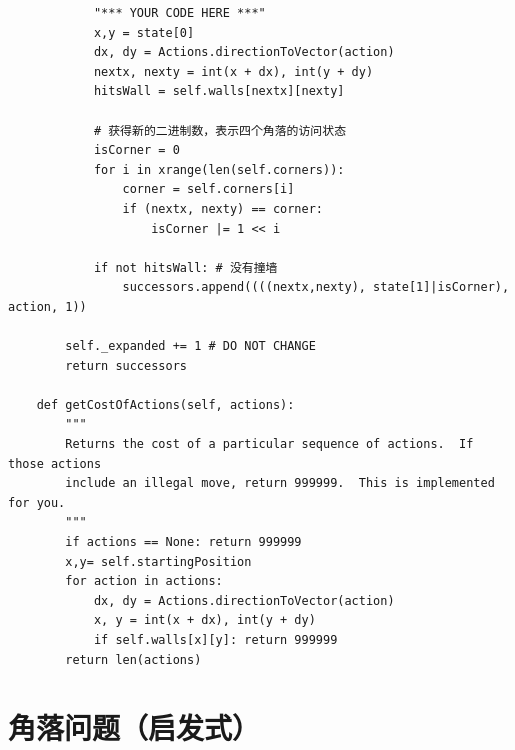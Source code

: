 \documentclass[forprint]{WHUBachelor}
\begin{document}
\begin{verbatim}
            "*** YOUR CODE HERE ***"
            x,y = state[0]
            dx, dy = Actions.directionToVector(action)
            nextx, nexty = int(x + dx), int(y + dy)
            hitsWall = self.walls[nextx][nexty]

            # 获得新的二进制数，表示四个角落的访问状态
            isCorner = 0
            for i in xrange(len(self.corners)):
                corner = self.corners[i]
                if (nextx, nexty) == corner:
                    isCorner |= 1 << i

            if not hitsWall: # 没有撞墙
                successors.append((((nextx,nexty), state[1]|isCorner), action, 1))

        self._expanded += 1 # DO NOT CHANGE
        return successors

    def getCostOfActions(self, actions):
        """
        Returns the cost of a particular sequence of actions.  If those actions
        include an illegal move, return 999999.  This is implemented for you.
        """
        if actions == None: return 999999
        x,y= self.startingPosition
        for action in actions:
            dx, dy = Actions.directionToVector(action)
            x, y = int(x + dx), int(y + dy)
            if self.walls[x][y]: return 999999
        return len(actions)

\end{verbatim}

\section{角落问题（启发式）}
\end{document}
